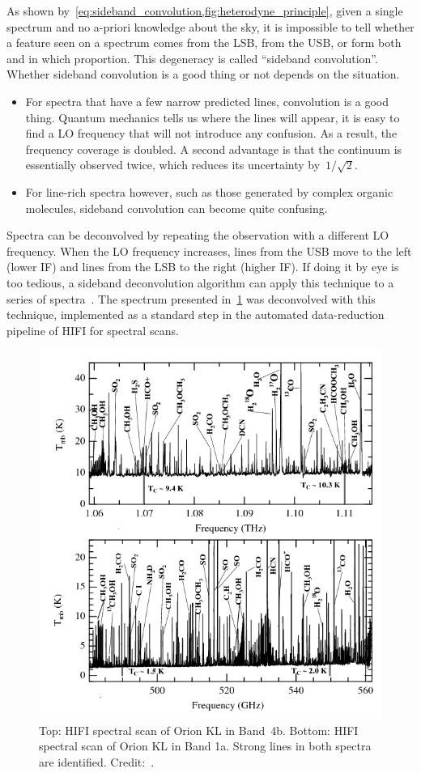 As shown by~\cref{eq:sideband_convolution,fig:heterodyne_principle}, given a single spectrum and no a-priori knowledge about the sky, it is impossible to tell whether a feature seen on a spectrum comes from the LSB, from the USB, or form both and in which proportion.
This degeneracy is called ``sideband convolution''.
Whether sideband convolution is a good thing or not depends on the situation.
\begin{itemize}[noitemsep,nolistsep]
    \item For spectra that have a few narrow predicted lines, convolution is a good thing.
    Quantum mechanics tells us where the lines will appear, it is easy to find a LO frequency that will not introduce any confusion.
    As a result, the frequency coverage is doubled.
    A second advantage is that the continuum is essentially observed twice, which reduces its uncertainty by~$1/\sqrt{2}$.
    \item For line-rich spectra however, such as those generated by complex organic molecules, sideband convolution can become quite confusing.
\end{itemize}

Spectra can be deconvolved by repeating the observation with a different LO frequency.
When the LO frequency increases, lines from the USB move to the left (lower IF) and lines from the LSB to the right (higher IF).
If doing it by eye is too tedious, a sideband deconvolution algorithm can apply this technique to a series of spectra~\parencite{comito2002deconvolution}.
The spectrum presented in~\cref{fig:hexos} was deconvolved with this technique, implemented as a standard step in the automated data-reduction pipeline of HIFI for spectral scans.

\begin{figure}[hbp]
    \centering
    \includegraphics[width=.6\textwidth]{hifi_hexos}
    \caption{Top: HIFI spectral scan of Orion KL in Band~4b. Bottom: HIFI spectral scan of Orion KL in Band 1a. Strong lines in both spectra are identified.  Credit:~\parencite{bergin2010herschel}.
    }
    \label{fig:hexos}
\end{figure}



